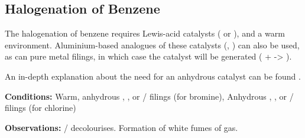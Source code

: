 

		\pagebreak
		\subsection{Halogenation of Benzene}

			The halogenation of benzene requires Lewis-acid catalysts ( or ), and a warm environment.
			Aluminium-based analogues of these catalysts (, ) can also be used, as can pure metal filings,
			in which case the catalyst will be generated  ( +  -> ).

			An in-depth explanation about the need for an anhydrous catalyst can be found \hyperlink{BenzeneHalogenationCatalyst}{}.

			\vspace{1.5em}
			\vbox{\textbf{Conditions:}	\tabto{35mm}Warm, anhydrous , , or  / \ch{\Al} filings (for bromine),
										\tabto{35mm}Anhydrous , , or
													 / \ch{\Al} filings (for chlorine)}

			\vspace{0.75em}
			\vbox{\textbf{Observations:}\tabto{35mm}  /   decolourises.
										\tabto{35mm}Formation of white fumes of  gas.}



